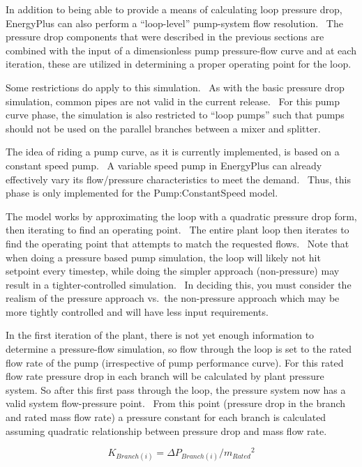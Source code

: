In addition to being able to provide a means of calculating loop pressure drop, EnergyPlus can also perform a ``loop-level'' pump-system flow resolution.~ The pressure drop components that were described in the previous sections are combined with the input of a dimensionless pump pressure-flow curve and at each iteration, these are utilized in determining a proper operating point for the loop.

Some restrictions do apply to this simulation.~ As with the basic pressure drop simulation, common pipes are not valid in the current release.~ For this pump curve phase, the simulation is also restricted to ``loop pumps'' such that pumps should not be used on the parallel branches between a mixer and splitter.

The idea of riding a pump curve, as it is currently implemented, is based on a constant speed pump.~ A variable speed pump in EnergyPlus can already effectively vary its flow/pressure characteristics to meet the demand.~ Thus, this phase is only implemented for the Pump:ConstantSpeed model.

The model works by approximating the loop with a quadratic pressure drop form, then iterating to find an operating point.~ The entire plant loop then iterates to find the operating point that attempts to match the requested flows.~ Note that when doing a pressure based pump simulation, the loop will likely not hit setpoint every timestep, while doing the simpler approach (non-pressure) may result in a tighter-controlled simulation.~ In deciding this, you must consider the realism of the pressure approach vs.~the non-pressure approach which may be more tightly controlled and will have less input requirements.

In the first iteration of the plant, there is not yet enough information to determine a pressure-flow simulation, so flow through the loop is set to the rated flow rate of the pump (irrespective of pump performance curve). For this rated flow rate pressure drop in each branch will be calculated by plant pressure system. So after this first pass through the loop, the pressure system now has a valid system flow-pressure point.~ From this point (pressure drop in the branch and rated mass flow rate) a pressure constant for each branch is calculated assuming quadratic relationship between pressure drop and mass flow rate.

\begin{equation}
{K_{Branch(i)}} = \Delta {P_{Branch(i)}}/{m_{Rated}}^2
\end{equation}

